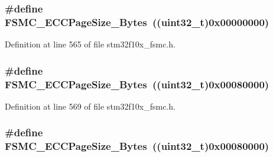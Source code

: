 \subsubsection[{\texorpdfstring{F\+S\+M\+C\+\_\+\+E\+C\+C\+Page\+Size\+\_\+256\+Bytes}{FSMC_ECCPageSize_256Bytes}}]{\setlength{\rightskip}{0pt plus 5cm}\#define F\+S\+M\+C\+\_\+\+E\+C\+C\+Page\+Size\+\_\+Bytes~(({\bf uint32\+\_\+t})0x00000000)}\hypertarget{group___f_s_m_c___e_c_c___page___size_gaaa1661267b44e6728fa64aca79de54b3}{}\label{group___f_s_m_c___e_c_c___page___size_gaaa1661267b44e6728fa64aca79de54b3}


Definition at line 565 of file stm32f10x\+\_\+fsmc.\+h.

\subsubsection[{\texorpdfstring{F\+S\+M\+C\+\_\+\+E\+C\+C\+Page\+Size\+\_\+4096\+Bytes}{FSMC_ECCPageSize_4096Bytes}}]{\setlength{\rightskip}{0pt plus 5cm}\#define F\+S\+M\+C\+\_\+\+E\+C\+C\+Page\+Size\+\_\+Bytes~(({\bf uint32\+\_\+t})0x00080000)}\hypertarget{group___f_s_m_c___e_c_c___page___size_gaec2e9e434685a1756bd171699248f65a}{}\label{group___f_s_m_c___e_c_c___page___size_gaec2e9e434685a1756bd171699248f65a}


Definition at line 569 of file stm32f10x\+\_\+fsmc.\+h.

\subsubsection[{\texorpdfstring{F\+S\+M\+C\+\_\+\+E\+C\+C\+Page\+Size\+\_\+4096\+Bytes}{FSMC_ECCPageSize_4096Bytes}}]{\setlength{\rightskip}{0pt plus 5cm}\#define F\+S\+M\+C\+\_\+\+E\+C\+C\+Page\+Size\+\_\+Bytes~(({\bf uint32\+\_\+t})0x00080000)}\hypertarget{group___f_s_m_c___e_c_c___page___size_gaec2e9e434685a1756bd171699248f65a}{}\label{group___f_s_m_c___e_c_c___page___size_gaec2e9e434685a1756bd171699248f65a}


